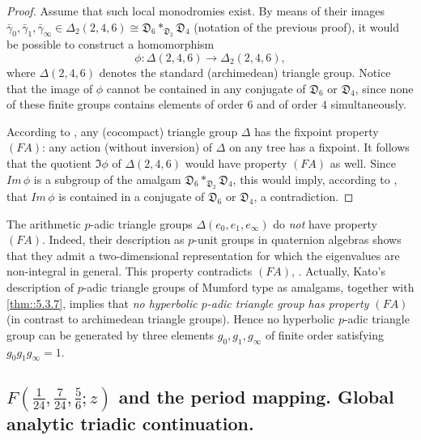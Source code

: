 \begin{proof}
 Assume that such local monodromies exist.  By means of their images
 $\bar\gamma_0,\bar\gamma_1,\bar\gamma_\infty \in \Delta_2(2,4,6)\cong 
 \mathfrak{D}_6 \ast_{\mathfrak{D}_2}\mathfrak{D}_4 $ (notation of 
 the previous proof), it would be possible to construct
 a homomorphism
 \begin{equation*}
  \phi: \Delta (2,4,6)\to\Delta_2(2,4,6),
 \end{equation*}
 where $\Delta (2,4,6)$ 
 denotes the standard (archimedean) triangle group.
 Notice that the image of $\phi$ cannot be contained in any conjugate 
 of $\mathfrak{D}_6$ or $\mathfrak{D}_4$, since none of
 these finite groups contains elements of order $6$ and of order $4$ 
 simultaneously.

  According to \cite[6.3.5]{aas}, any (cocompact) triangle group 
 $\Delta$ has the
 fixpoint property $(FA)$: any action (without inversion) of $\Delta$ 
 on any tree has a fixpoint. It follows that the
 quotient
 $\Im\phi$ of $\Delta (2,4,6)$ would have property
 $(FA)$ as well. Since $Im\,\phi$ is a subgroup of the amalgam
 $\mathfrak{D}_6 \ast_{\mathfrak{D}_2}\mathfrak{D}_4$, this would 
 imply, according to \cite[6.2, prop. 21]{aas}, that
 $Im\,\phi$ is contained in a conjugate of $\mathfrak{D}_6$ or 
 $\mathfrak{D}_4$, a contradiction. 
\end{proof}

\begin{rem}
 The arithmetic $p$-adic triangle groups 
 $\Delta (e_0,e_1,e_\infty)$ do {\it not} have property
 $(FA)$. Indeed, their description as $p$-unit groups in quaternion 
 algebras shows that they admit a two-dimensional
 representation for which the eigenvalues are non-integral in general. 
 This property contradicts $(FA)$, \cf \cite[6.2, prop. 22]{aas}.
   Actually, Kato's description of $p$-adic triangle groups of Mumford 
 type as amalgams, together with \ref{thm::5.3.7}, implies that
 {\it no hyperbolic $p$-adic triangle group has property $(FA)$} (in 
 contrast to archimedean triangle groups).  Hence no hyperbolic $p$-adic
 triangle group can be generated by three elements $g_0,g_1,g_\infty$ of
 finite order satisfying $g_0g_1g_\infty=1$.
\end{rem}

\subsection{$F(\frac{1}{24}, \frac{7}{24},\frac{5}{6}; z)$ and the period 
mapping. Global analytic triadic continuation.}\label{sub::6.5}

